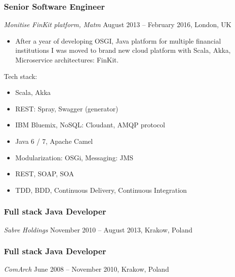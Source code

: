 \documentclass[]{rss}
\providecommand{\tightlist}{%
  \setlength{\itemsep}{0pt}\setlength{\parskip}{0pt}}
\begin{document}
\begin{resume}
\subsubsection{Senior Software Engineer}\label{senior-software-engineer}

\emph{Monitise \textbar{} FinKit platform, Matm} August 2013 -- February
2016, London, UK

\begin{itemize}
\tightlist
\item
  After a year of developing OSGI, Java platform for multiple financial
  institutions I was moved to brand new cloud platform with Scala, Akka,
  Microservice architectures: FinKit.
\end{itemize}

Tech stack:

\begin{itemize}
\tightlist
\item
  Scala, Akka
\item
  REST: Spray, Swagger (generator)
\item
  IBM Bluemix, NoSQL: Cloudant, AMQP protocol
\item
  Java 6 / 7, Apache Camel
\item
  Modularization: OSGi, Messaging: JMS
\item
  REST, SOAP, SOA
\item
  TDD, BDD, Continuous Delivery, Continuous Integration
\end{itemize}

\subsubsection{Full stack Java
Developer}\label{full-stack-java-developer}

\emph{Sabre Holdings} November 2010 -- August 2013, Krakow, Poland

\subsubsection{Full stack Java
Developer}\label{full-stack-java-developer-1}

\emph{ComArch} June 2008 -- November 2010, Krakow, Poland

\end{resume}
\end{document}
